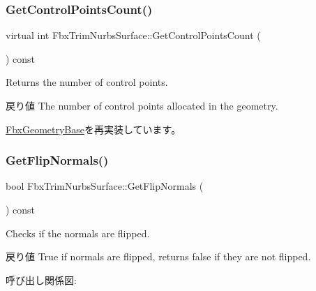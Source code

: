 \mbox{\label{class_fbx_trim_nurbs_surface_a11c7260f31786dd8ace17769d0ccb302}} 
\subsubsection{\texorpdfstring{Get\+Control\+Points\+Count()}{GetControlPointsCount()}}
{\footnotesize\ttfamily virtual int Fbx\+Trim\+Nurbs\+Surface\+::\+Get\+Control\+Points\+Count (\begin{DoxyParamCaption}{ }\end{DoxyParamCaption}) const\hspace{0.3cm}{\ttfamily [virtual]}}

Returns the number of control points. \begin{DoxyReturn}{戻り値}
The number of control points allocated in the geometry. 
\end{DoxyReturn}


\hyperlink{class_fbx_geometry_base_aa9f42ae6a958036722670143fabf3b17}{Fbx\+Geometry\+Base}を再実装しています。

\mbox{\label{class_fbx_trim_nurbs_surface_ae8e939290c0ab69be23fa28b6c1d8cf7}} 
\subsubsection{\texorpdfstring{Get\+Flip\+Normals()}{GetFlipNormals()}}
{\footnotesize\ttfamily bool Fbx\+Trim\+Nurbs\+Surface\+::\+Get\+Flip\+Normals (\begin{DoxyParamCaption}{ }\end{DoxyParamCaption}) const}

Checks if the normals are flipped. \begin{DoxyReturn}{戻り値}
{\ttfamily True} if normals are flipped, returns {\ttfamily false} if they are not flipped. 
\end{DoxyReturn}
呼び出し関係図\+:
\mbox{\label{class_fbx_trim_nurbs_surface_a59e3a2e5a7d89476e0bbd61dcf00aede}} 
